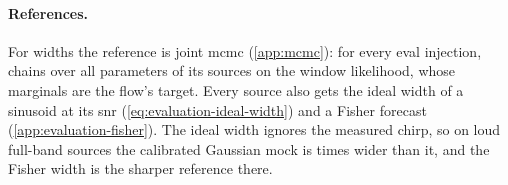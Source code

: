 \paragraph{References.} For widths the reference is joint \ac{mcmc} (\cref{app:mcmc}): for every
eval injection, chains over all \RelatedWorkParameters{} parameters of its sources on the window
likelihood, whose marginals are the flow's target. Every
source also gets the ideal width of a sinusoid at its \ac{snr} (\cref{eq:evaluation-ideal-width})
and a Fisher forecast (\cref{app:evaluation-fisher}). The ideal width ignores the measured chirp,
so on loud full-band sources the calibrated Gaussian mock is \EvaluationMockFisherIdealFull{} times
wider than it, and the Fisher width is the sharper reference there.
